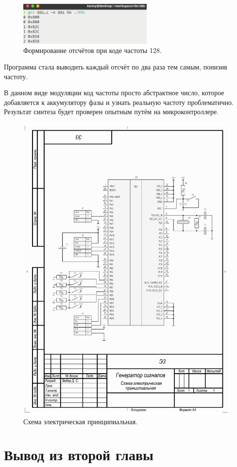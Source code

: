 \begin{figure}[H]
    \centering
    \includegraphics[width=0.6\textwidth]{../image/dds128.png}
    \caption{Формирование отсчётов при коде частоты 128.}
\end{figure}

	Программа стала выводить каждый отсчёт по два раза тем самым, понизив частоту.
	
	В данном виде модуляции код частоты просто абстрактное число, которое добавляется к аккумулятору фазы и узнать реальную частоту проблематично. Результат синтеза будет проверен опытным путём на микроконтроллере.



\begin{figure}[h]
    \centering
    \includegraphics[width=1.0\textwidth]{../image/scheme-cropped.pdf}
    \caption{Схема электрическая принципиальная.}
\end{figure}

\section{Вывод из второй главы}
